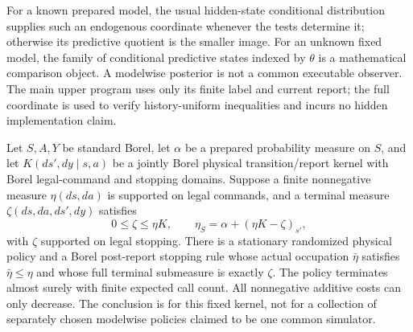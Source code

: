 For a known prepared model, the usual hidden-state conditional distribution supplies such an endogenous coordinate whenever the tests determine it; otherwise its predictive quotient is the smaller image. For an unknown fixed model, the family of conditional predictive states indexed by $\theta$ is a mathematical comparison object. A modelwise posterior is not a common executable observer. The main upper program uses only its finite label and current report; the full coordinate is used to verify history-uniform inequalities and incurs no hidden implementation claim.

\begin{theorem}\label{thm:borel-flow}
Let $S,A,Y$ be standard Borel, let $\alpha$ be a prepared probability measure on $S$, and let $K(ds',dy\mid s,a)$ be a jointly Borel physical transition/report kernel with Borel legal-command and stopping domains. Suppose a finite nonnegative measure $\eta(ds,da)$ is supported on legal commands, and a terminal measure $\zeta(ds,da,ds',dy)$ satisfies
\begin{equation}\label{eq:borel-balance}
 0\le\zeta\le\eta K,\qquad
 \eta_S=\alpha+(\eta K-\zeta)_{s'},
\end{equation}
with $\zeta$ supported on legal stopping. There is a stationary randomized physical policy and a Borel post-report stopping rule whose actual occupation $\bar\eta$ satisfies $\bar\eta\le\eta$ and whose full terminal submeasure is exactly $\zeta$. The policy terminates almost surely with finite expected call count. All nonnegative additive costs can only decrease. The conclusion is for this fixed kernel, not for a collection of separately chosen modelwise policies claimed to be one common simulator.
\end{theorem}
